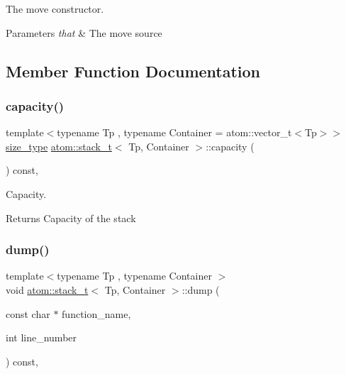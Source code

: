 The move constructor. 


\begin{DoxyParams}{Parameters}
{\em that} & The move source \\
\hline
\end{DoxyParams}


\subsection{Member Function Documentation}
\mbox{\label{classatom_1_1stack__t_ace44f2ab1b95b156fd30e25f26f8065e}} 
\subsubsection{\texorpdfstring{capacity()}{capacity()}}
{\footnotesize\ttfamily template$<$typename Tp , typename Container  = atom\+::vector\+\_\+t$<$\+Tp$>$$>$ \\
\hyperlink{classatom_1_1stack__t_a43888b80c0b6cceea0509a3646823f98}{size\+\_\+type} \hyperlink{classatom_1_1stack__t}{atom\+::stack\+\_\+t}$<$ Tp, Container $>$\+::capacity (\begin{DoxyParamCaption}{ }\end{DoxyParamCaption}) const\hspace{0.3cm}{\ttfamily [inline]}, {\ttfamily [noexcept]}}



Capacity. 

\begin{DoxyReturn}{Returns}
Capacity of the stack 
\end{DoxyReturn}
\mbox{\label{classatom_1_1stack__t_a424f65300ba04f8000ec6bf315595d1b}} 
\subsubsection{\texorpdfstring{dump()}{dump()}}
{\footnotesize\ttfamily template$<$typename Tp , typename Container $>$ \\
void \hyperlink{classatom_1_1stack__t}{atom\+::stack\+\_\+t}$<$ Tp, Container $>$\+::dump (\begin{DoxyParamCaption}\item[{const char $\ast$}]{function\+\_\+name,  }\item[{int}]{line\+\_\+number }\end{DoxyParamCaption}) const\hspace{0.3cm}{\ttfamily [private]}, {\ttfamily [noexcept]}}



